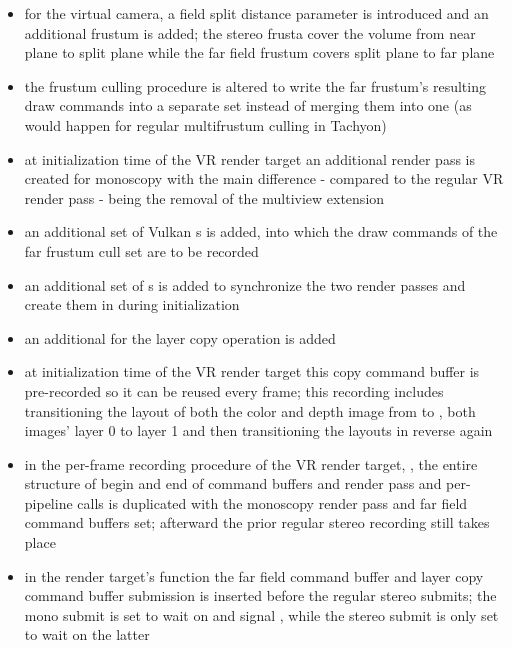 \begin{itemize}
\item for the virtual camera, a field split distance parameter is introduced and an additional frustum is added; the stereo frusta cover the volume from near plane to split plane while the far field frustum covers split plane to far plane
\item the frustum culling procedure is altered to write the far frustum's resulting draw commands into a separate set instead of merging them into one (as would happen for regular multifrustum culling in \gls{Tachyon})
\item at initialization time of the \gls{VR} render target an additional render pass is created for monoscopy with the main difference - compared to the regular \gls{VR} render pass - being the removal of the multiview extension
\item an additional set of Vulkan s is added, into which the draw commands of the far frustum cull set are to be recorded
\item an additional set of s is added to synchronize the two render passes and create them in  during initialization
\item an additional  for the layer copy operation is added
\item at initialization time of the \gls{VR} render target this copy command buffer is pre-recorded so it can be reused every frame; this recording includes transitioning the layout of both the color and depth image from  to ,  both images' layer 0 to layer 1 and then transitioning the layouts in reverse again
\item in the per-frame recording procedure of the \gls{VR} render target, , the entire structure of begin and end of command buffers and render pass and per-pipeline  calls is duplicated with the monoscopy render pass and far field command buffers set; afterward the prior regular stereo recording still takes place
\item in the render target's  function the far field command buffer and layer copy command buffer submission is inserted before the regular stereo submits; the mono submit is set to wait on  and signal , while the stereo submit is only set to wait on the latter

\end{itemize}
